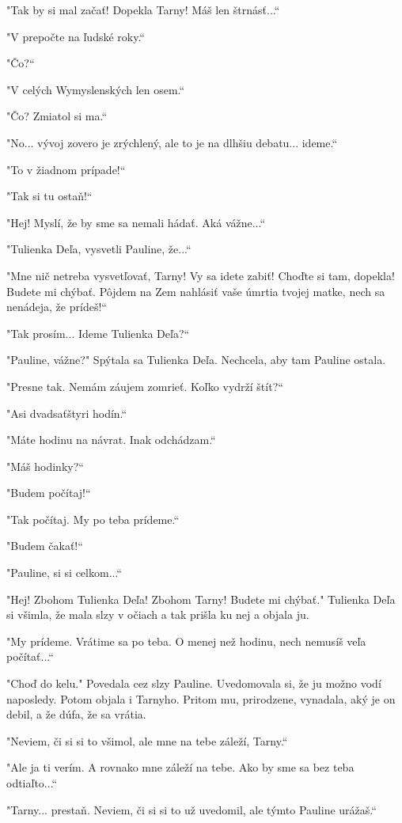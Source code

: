 \documentclass{book}
\begin{document}
"$ $Tak by si mal začať! Dopekla Tarny! Máš len štrnásť...“

"$ $V prepočte na ľudské roky.“

"$ $Čo?“

"$ $V celých Wymyslenských len osem.“

"$ $Čo? Zmiatol si ma.“

"$ $No... vývoj zovero je zrýchlený, ale to je na dlhšiu debatu... ideme.“

"$ $To v žiadnom prípade!“

"$ $Tak si tu ostaň!“

"$ $Hej! Myslí, že by sme sa nemali hádať. Aká vážne...“

"$ $Tulienka Deľa, vysvetli Pauline, že...“

"$ $Mne nič netreba vysvetľovať, Tarny! Vy sa idete zabiť! Choďte si tam, dopekla! Budete mi chýbať. Pôjdem na Zem nahlásiť vaše úmrtia tvojej matke, nech sa nenádeja, že prídeš!“

"$ $Tak prosím... Ideme Tulienka Deľa?“

"$ $Pauline, vážne?"$ $ Spýtala sa Tulienka Deľa. Nechcela, aby tam Pauline ostala.

"$ $Presne tak. Nemám záujem zomrieť. Koľko vydrží štít?“

"$ $Asi dvadsaťštyri hodín.“

"$ $Máte hodinu na návrat. Inak odchádzam.“

"$ $Máš hodinky?“

"$ $Budem počítaj!“

"$ $Tak počítaj. My po teba prídeme.“

"$ $Budem čakať!“

"$ $Pauline, si si celkom...“

"$ $Hej! Zbohom Tulienka Deľa! Zbohom Tarny! Budete mi chýbať."$ $ Tulienka Deľa si všimla, že mala slzy v očiach a tak prišla ku nej a objala ju.

"$ $My prídeme. Vrátime sa po teba. O menej než hodinu, nech nemusíš veľa počítať...“

"$ $Choď do kelu."$ $ Povedala cez slzy Pauline. Uvedomovala si, že ju možno vodí naposledy. Potom objala i Tarnyho. Pritom mu, prirodzene, vynadala, aký je on debil, a že dúfa, že sa vrátia.

"$ $Neviem, či si si to všimol, ale mne na tebe záleží, Tarny.“

"$ $Ale ja ti verím. A rovnako mne záleží na tebe. Ako by sme sa bez teba odtiaľto...“

"$ $Tarny... prestaň. Neviem, či si si to už uvedomil, ale týmto Pauline urážaš.“
\end{document}
